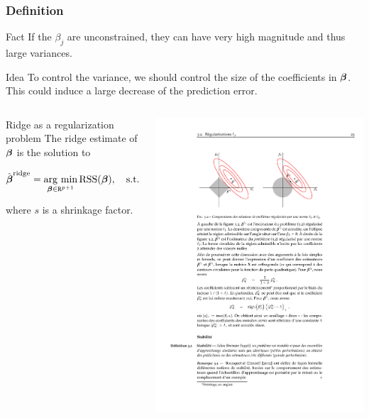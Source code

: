 \documentclass[10pt, c, xcolor=x11names]{beamer}\usepackage[]{graphicx}\usepackage[]{color}
\begin{document}
\begin{frame}
  \frametitle{Definition}

  \begin{block}{Fact}
    If  the  $\beta_j$ are  unconstrained,  they  can  have very  high
    magnitude and thus large variances.
  \end{block}

  \begin{block}{Idea}
    To  control  the variance,  we  should  control  the size  of  the
    coefficients in  $\boldsymbol\beta$. This could  induce a large  decrease of
    the prediction error.
  \end{block}

  \begin{overlayarea}{\textwidth}{.4\textheight}
    \begin{columns}
      \begin{column}[c]{.6\textwidth}
        \begin{block}{Ridge as a regularization problem}
          The ridge estimate of $\boldsymbol\beta$ is the solution to
          \begin{equation*}
            \hat{\boldsymbol\beta}^{\text{ridge}}     =    \mathop{\mathrm{arg\ min}}_{\boldsymbol\beta\in\texttt{R}^{p+1}}
            \mathrm{RSS}(\boldsymbol\beta), \quad  \text{s.t. } \sum_{j=1}^p \beta_j^2
            \leq s,
          \end{equation*}
          where $s$ is a shrinkage factor.
        \end{block}
      \end{column}
      \begin{column}{.4\textwidth}
        \includegraphics[width=.7\textwidth]{figures/ridge_set}
      \end{column}
    \end{columns}
  \end{overlayarea}
\end{frame}
\end{document}

